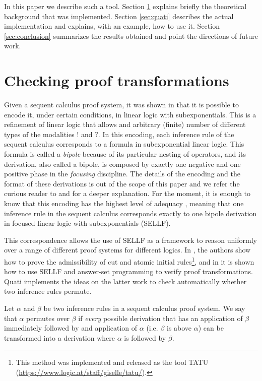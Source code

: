 \documentclass{llncs}
\begin{document}
In this paper we describe such a tool. Section \ref{sec:checking} explains
briefly the theoretical background that was implemented. Section \ref{sec:quati}
describes the actual implementation and explains, with an example, how to use
it. Section \ref{sec:conclusion} summarizes the results obtained and point the
directions of future work.

\section{Checking proof transformations}
\label{sec:checking}


Given a sequent calculus proof system, it was shown in \cite{ENTCS?} that it
is possible to encode it, under certain conditions, in linear logic with
subexponentials. This is a refinement of linear logic that allows and
arbitrary (finite) number of different types of the modalities $!$ and $?$. In
this encoding, each inference rule of the sequent calculus corresponds to a
formula in subexponential linear logic. This formula is called a \emph{bipole} because of its
particular nesting of operators, and its derivation, also called a bipole, is composed by exactly one
negative and one positive phase in the \emph{focusing} discipline. The details
of the encoding and the format of these derivations is out of the scope of this
paper and we refer the curious reader to \cite{llinda} and \cite{JLC paper} for
a deeper explanation. For the moment, it is enough to know that this encoding
has the highest level of adequacy \cite{adequacy??}, meaning that one inference
rule in the sequent calculus corresponds exactly to one bipole derivation in
focused linear logic with subexponentials (SELLF).

This correspondence allows the use of SELLF as a framework to reason
uniformly over a range of different proof systems for different logics. In
\cite{JLC?}, the authors show how to prove the admissibility of cut and atomic
initial rules\footnote{This method was implemented and released as the tool
TATU (\url{https://www.logic.at/staff/giselle/tatu/}).}, and in \cite{iclp
paper} it is shown how to use SELLF and answer-set programming to verify proof
transformations. Quati implements the ideas on the latter work to check
automatically whether two inference rules permute. 

\begin{definition}
Let $\alpha$ and $\beta$ be two inference rules in a sequent calculus proof
system. We say that $\alpha$ permutes over $\beta$ if \emph{every} possible
derivation that has an application of $\beta$ immediately followed by and
application of $\alpha$ (i.e. $\beta$ is above $\alpha$) can be transformed into
a derivation where $\alpha$ is followed by $\beta$.
\end{definition}
\end{document}
